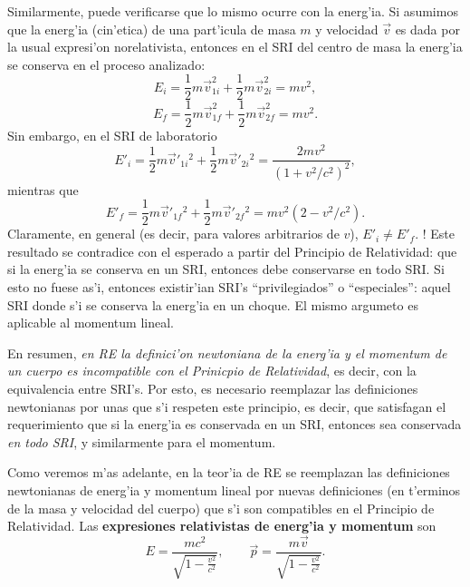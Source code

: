 Similarmente, puede verificarse que lo mismo ocurre con la energ'ia. 
Si asumimos que la energ'ia (cin'etica) de una part'icula de masa $m$ y velocidad $\vec{v}$ es dada por la usual expresi'on norelativista, entonces en el SRI del centro de masa la energ'ia se conserva en el proceso analizado:
\begin{equation}
 E_i=\frac{1}{2}m\vec{v}_{1i}^2+\frac{1}{2}m\vec{v}_{2i}^2=mv^2,
\end{equation}
\begin{equation}
 E_f=\frac{1}{2}m\vec{v}_{1f}^2+\frac{1}{2}m\vec{v}_{2f}^2=mv^2.
\end{equation}
Sin embargo, en el SRI de laboratorio
\begin{equation}
 E'_i=\frac{1}{2}m\vec{v}'_{1i}{}^2+\frac{1}{2}m\vec{v}'_{2i}{}^2=\frac{2mv^2}{(1+v^2/c^2)^2},
\end{equation}
mientras que
\begin{equation}
 E'_f=\frac{1}{2}m\vec{v}'_{1f}{}^2+\frac{1}{2}m\vec{v}'_{2f}{}^2=mv^2\left(2-v^2/c^2\right).
\end{equation}
Claramente, en general (es decir, para valores arbitrarios de $v$),  $ E'_i\neq E'_f$. ! Este resultado se contradice con el esperado a partir del Principio de Relatividad: que si la energ'ia se conserva en un SRI, entonces debe conservarse en todo SRI. Si esto no fuese as'i, entonces existir'ian SRI's ``privilegiados'' o ``especiales'': aquel SRI donde s'i se conserva la energ'ia en un choque. El mismo argumeto es aplicable al momentum lineal.

En resumen, \textit{en RE la definici'on newtoniana de la energ'ia y el momentum de un cuerpo es incompatible con el Prinicpio de Relatividad}, es decir, con la equivalencia entre SRI's. Por esto, es necesario reemplazar las definiciones newtonianas por unas que s'i respeten este principio, es decir, que satisfagan el requerimiento que si la energ'ia es conservada en un SRI, entonces sea conservada \textit{en todo SRI}, y similarmente para el momentum.

Como veremos m'as adelante, en la teor'ia de RE se reemplazan las definiciones newtonianas de energ'ia y momentum lineal por nuevas definiciones (en t'erminos de la masa y velocidad del cuerpo) que s'i son compatibles en el Principio de Relatividad. Las \textbf{expresiones relativistas de energ'ia y momentum} son
\begin{equation}
E=\frac{mc^2}{\sqrt{1-\frac{v^2}{c^2}}}, \qquad \vec{p}=\frac{m\vec{v}}{\sqrt{1-\frac{v^2}{c^2}}}.
\end{equation}

